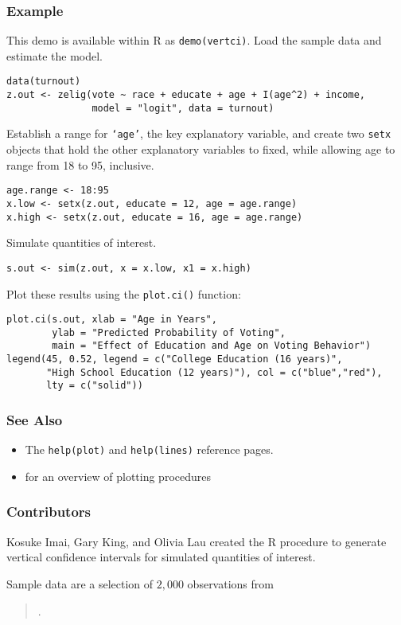 \subsubsection{Example}

This demo is available within R as {\tt demo(vertci)}.  Load the
sample data and estimate the model.
\begin{verbatim}
data(turnout)
z.out <- zelig(vote ~ race + educate + age + I(age^2) + income,
               model = "logit", data = turnout)
\end{verbatim}
Establish a range for {\tt `age'}, the key explanatory variable, and
create two {\tt setx} objects that hold the other explanatory
variables to fixed, while allowing age to range from 18 to 95, inclusive.
\begin{verbatim}
age.range <- 18:95
x.low <- setx(z.out, educate = 12, age = age.range)
x.high <- setx(z.out, educate = 16, age = age.range)
\end{verbatim}
Simulate quantities of interest.  
\begin{verbatim}
s.out <- sim(z.out, x = x.low, x1 = x.high)
\end{verbatim}
Plot these results using the {\tt plot.ci()} function:  
\begin{verbatim}
plot.ci(s.out, xlab = "Age in Years",
        ylab = "Predicted Probability of Voting",
        main = "Effect of Education and Age on Voting Behavior")
legend(45, 0.52, legend = c("College Education (16 years)",
       "High School Education (12 years)"), col = c("blue","red"), 
       lty = c("solid"))
\end{verbatim}

\subsubsection{See Also}
\begin{itemize}
  \item The {\tt help(plot)} and {\tt help(lines)} reference pages.    
  \item {} for an overview of plotting procedures
\end{itemize}

\subsubsection{Contributors}

Kosuke Imai, Gary King, and Olivia Lau created the R procedure to
generate vertical confidence intervals for simulated quantities of
interest.  

Sample data are a selection of $2,000$ observations from
\begin{verse}
.  
\end{verse}
